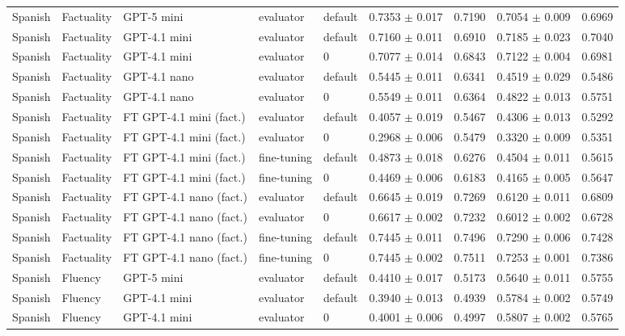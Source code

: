 \begin{tabular}{lllllcccc}
\hline
Spanish & Factuality & GPT-5 mini & evaluator & default & 0.7353 $\pm$ 0.017 & 0.7190 & 0.7054 $\pm$ 0.009 & 0.6969 \\
Spanish & Factuality & GPT-4.1 mini & evaluator & default & 0.7160 $\pm$ 0.011 & 0.6910 & 0.7185 $\pm$ 0.023 & 0.7040 \\
Spanish & Factuality & GPT-4.1 mini & evaluator & 0 & 0.7077 $\pm$ 0.014 & 0.6843 & 0.7122 $\pm$ 0.004 & 0.6981 \\
Spanish & Factuality & GPT-4.1 nano & evaluator & default & 0.5445 $\pm$ 0.011 & 0.6341 & 0.4519 $\pm$ 0.029 & 0.5486 \\
Spanish & Factuality & GPT-4.1 nano & evaluator & 0 & 0.5549 $\pm$ 0.011 & 0.6364 & 0.4822 $\pm$ 0.013 & 0.5751 \\
Spanish & Factuality & FT GPT-4.1 mini (fact.) & evaluator & default & 0.4057 $\pm$ 0.019 & 0.5467 & 0.4306 $\pm$ 0.013 & 0.5292 \\
Spanish & Factuality & FT GPT-4.1 mini (fact.) & evaluator & 0 & 0.2968 $\pm$ 0.006 & 0.5479 & 0.3320 $\pm$ 0.009 & 0.5351 \\
Spanish & Factuality & FT GPT-4.1 mini (fact.) & fine-tuning & default & 0.4873 $\pm$ 0.018 & 0.6276 & 0.4504 $\pm$ 0.011 & 0.5615 \\
Spanish & Factuality & FT GPT-4.1 mini (fact.) & fine-tuning & 0 & 0.4469 $\pm$ 0.006 & 0.6183 & 0.4165 $\pm$ 0.005 & 0.5647 \\
Spanish & Factuality & FT GPT-4.1 nano (fact.) & evaluator & default & 0.6645 $\pm$ 0.019 & 0.7269 & 0.6120 $\pm$ 0.011 & 0.6809 \\
Spanish & Factuality & FT GPT-4.1 nano (fact.) & evaluator & 0 & 0.6617 $\pm$ 0.002 & 0.7232 & 0.6012 $\pm$ 0.002 & 0.6728 \\
Spanish & Factuality & FT GPT-4.1 nano (fact.) & fine-tuning & default & 0.7445 $\pm$ 0.011 & 0.7496 & 0.7290 $\pm$ 0.006 & 0.7428 \\
Spanish & Factuality & FT GPT-4.1 nano (fact.) & fine-tuning & 0 & 0.7445 $\pm$ 0.002 & 0.7511 & 0.7253 $\pm$ 0.001 & 0.7386 \\
\hline
Spanish & Fluency & GPT-5 mini & evaluator & default & 0.4410 $\pm$ 0.017 & 0.5173 & 0.5640 $\pm$ 0.011 & 0.5755 \\
Spanish & Fluency & GPT-4.1 mini & evaluator & default & 0.3940 $\pm$ 0.013 & 0.4939 & 0.5784 $\pm$ 0.002 & 0.5749 \\
Spanish & Fluency & GPT-4.1 mini & evaluator & 0 & 0.4001 $\pm$ 0.006 & 0.4997 & 0.5807 $\pm$ 0.002 & 0.5765 \\

\end{tabular}
